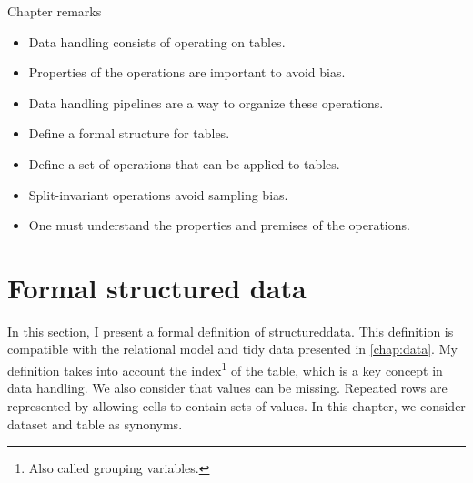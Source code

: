 \begin{mainbox}{Chapter remarks}


  \startcontents[chapters]
  \vspace{1em}


  \begin{itemize}
    \itemsep0em
    \item Data handling consists of operating on tables.
    \item Properties of the operations are important to avoid bias.
    \item Data handling pipelines are a way to organize these operations.
  \end{itemize}


  \begin{itemize}
    \itemsep0em
    \item Define a formal structure for tables.
    \item Define a set of operations that can be applied to tables.
  \end{itemize}


  \begin{itemize}
    \itemsep0em
    \item Split-invariant operations avoid sampling bias.
    \item One must understand the properties and premises of the operations.
  \end{itemize}
\end{mainbox}

{}
\clearpage

\section{Formal structured data}
\label{sec:formal-structured-data}

\newcommand{\domainof}[1]{\mathcal{D}\!\left(#1\right)}
\newcommand{\missing}{\text{?}}
\newcommand{\rowcard}[1][k_1, \dots, k_k]{\operatorname{card}\!\left(#1\right)}

In this section, I present a formal definition of \gls{structureddata}.  This definition is
compatible with the relational model and tidy data presented in \cref{chap:data}.
My definition takes into account the index\footnote{Also called grouping variables.} of
the table, which is a key concept in data handling.  We also consider that values can be
missing.  Repeated rows are represented by allowing cells to contain sets of values.
In this chapter, we consider dataset and table as synonyms.

